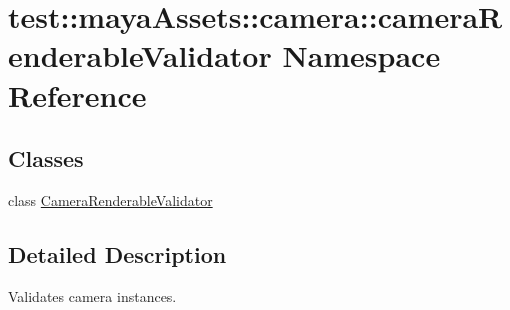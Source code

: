 \hypertarget{namespacetest_1_1mayaAssets_1_1camera_1_1cameraRenderableValidator}{\section{test\-:\-:maya\-Assets\-:\-:camera\-:\-:camera\-Renderable\-Validator \-Namespace \-Reference}
\label{dc/d5e/namespacetest_1_1mayaAssets_1_1camera_1_1cameraRenderableValidator}
}
\subsection*{\-Classes}
\begin{DoxyCompactItemize}
\item 
class \hyperlink{classtest_1_1mayaAssets_1_1camera_1_1cameraRenderableValidator_1_1CameraRenderableValidator}{\-Camera\-Renderable\-Validator}
\end{DoxyCompactItemize}


\subsection{\-Detailed \-Description}
\begin{DoxyVerb}
Validates camera instances.
\end{DoxyVerb}
 